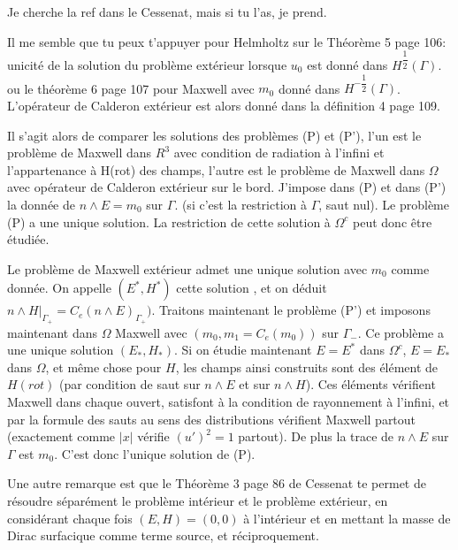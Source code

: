 \documentclass[12pt,%
    twoside,%
    a4paper,%
    openright, %
    ]{book}
\numberwithin{equation}{section} %
\renewcommand{\frac}[2]{\dfrac{#1}{#2}} %
\newcounter{REM}
\newenvironment{REM}[1][\theREM]
    {%
        \stepcounter{REM}
        \hypertarget{REM#1}{}%
        \pdfbookmark[0]{REM \theREM}{REM#1}
        \begin{tcolorbox}[%
                title={Remarque \theREM},%
                colback=red!30!white,%
                colframe=red!75!black,%
            ]
    }
    {
        \end{tcolorbox}%
    }%
\begin{document}
    \begin{REM}
        Je cherche la ref dans le Cessenat, mais si tu l'as, je prend.
        
        Il me semble que tu peux t'appuyer pour Helmholtz sur le Théorème 5 page 106: unicité de la solution du problème extérieur lorsque $u_0$ est donné dans $H^{\frac12}(\Gamma)$. ou le théorème 6 page 107 pour Maxwell avec $m_0$ donné dans $H^{-\frac12}(\Gamma)$. L'opérateur de Calderon extérieur est alors donné dans la définition 4 page 109.
        
        Il s'agit alors de comparer les solutions des problèmes (P) et (P'), l'un est le problème de Maxwell dans $R^3$ avec condition de radiation à l'infini et l'appartenance à H(rot) des champs, l'autre est le problème de Maxwell dans $\Omega$ avec opérateur de Calderon extérieur sur le bord. J'impose dans (P) et dans (P') la donnée de $n\wedge E=m_0$ sur $\Gamma$. (si c'est la restriction à $\Gamma$, saut nul).
         Le problème (P)  a une unique solution. La restriction de cette solution à $\Omega^c$ peut donc être étudiée.
         
         
         Le problème de Maxwell extérieur admet une unique solution avec $m_0$ comme donnée. On appelle $(E^*, H^*)$ cette solution , et on déduit $n\wedge H\vert_{\Gamma_+}= C_e(n\wedge E)_{\Gamma_+})$.
        Traitons maintenant le problème (P') et imposons maintenant dans $\Omega$ Maxwell avec $(m_0, m_1=C_e(m_0))$ sur $\Gamma_-$. Ce problème a une unique solution $(E_*, H_*)$. Si on étudie maintenant $E=E^*$ dans $\Omega^c$, $E=E_*$ dans $\Omega$, et même chose pour $H$, les champs ainsi construits sont des élément de $H(rot)$ (par condition de saut sur $n\wedge E$ et sur $n\wedge H$). Ces éléments vérifient Maxwell dans chaque ouvert, satisfont à la condition de rayonnement à l'infini, et par la formule des sauts au sens des distributions vérifient Maxwell partout (exactement comme $\vert x\vert$ vérifie $(u')^2=1$ partout). De plus la trace de $n\wedge E$ sur $\Gamma$ est $m_0$. C'est donc l'unique solution de (P).
        
        
    \end{REM}
    \begin{REM}
    Une autre remarque est que le Théorème 3 page 86 de Cessenat te permet de résoudre séparément le problème intérieur et le problème extérieur, en considérant chaque fois $(E,H)=(0,0)$ à l'intérieur et en mettant la masse de Dirac surfacique comme terme source, et réciproquement.
    \end{REM}
\end{document}
